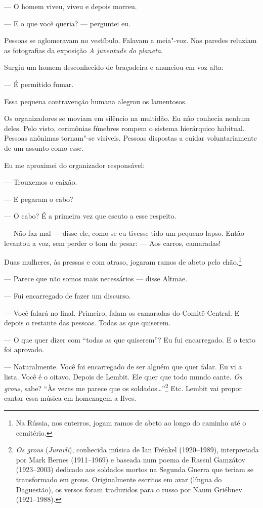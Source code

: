 --- O homem viveu, viveu e depois morreu.

--- E o que você queria? --- perguntei eu.

\bigskip

Pessoas se aglomeravam no vestíbulo. Falavam a meia"-voz. Nas paredes
reluziam as fotografias da exposição \emph{A juventude do planeta}.

Surgiu um homem desconhecido de braçadeira e anunciou em voz alta:

--- É permitido fumar.

Essa pequena contravenção humana alegrou os lamentosos.

Os organizadores se moviam em silêncio na multidão. Eu não conhecia
nenhum deles. Pelo visto, cerimônias fúnebres rompem o sistema
hierárquico habitual. Pessoas anônimas tornam"-se visíveis. Pessoas
dispostas a cuidar voluntariamente de um assunto como esse.

Eu me aproximei do organizador responsável:

--- Trouxemos o caixão.

--- E pegaram o cabo?

--- O cabo? É a primeira vez que escuto a esse respeito.

--- Não faz mal --- disse ele, como se eu tivesse tido um pequeno lapso.
Então levantou a voz, sem perder o tom de pesar: --- Aos carros,
camaradas!

Duas mulheres, às pressas e com atraso, jogaram ramos de abeto pelo
chão.\footnote{Na Rússia, nos enterros, jogam ramos de abeto ao longo
  do caminho até o cemitério.}

--- Parece que não somos mais necessários --- disse Altmäe.

--- Fui encarregado de fazer um discurso.

--- Você falará no final. Primeiro, falam os camaradas do Comitê
Central. E depois o restante das pessoas. Todas as que quiserem.

--- O que quer dizer com ``todas as que quiserem''? Eu fui encarregado.
E o texto foi aprovado.

--- Naturalmente. Você foi encarregado de ser alguém que quer falar. Eu
vi a lista. Você é o oitavo. Depois de Lembit. Ele quer que todo mundo
cante. \emph{Os grous}, sabe? ``Às vezes me parece que os
soldados\ldots{}''\footnote{\emph{Os grous} (\emph{Juravli}),
  conhecida música de Ian Frénkel (1920--1989), interpretada por Mark
  Bernes (1911--1969) e baseada num poema de Rassul Gamzátov
  (1923--2003) dedicado aos soldados mortos na Segunda Guerra que teriam
  se transformado em grous. Originalmente escritos em avar (língua do
  Daguestão), os versos foram traduzidos para o russo por Naum Griébnev
  (1921--1988).} Etc. Lembit vai propor cantar essa música em homenagem
a Ilves.


